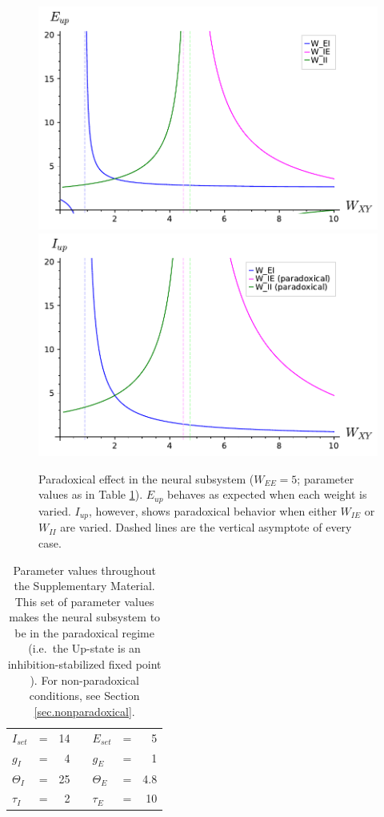 \documentclass[twocolumn]{article}
\newcommand{\EE}{\mathit{EE}}
\newcommand{\IE}{\mathit{IE}}
\newcommand{\II}{\mathit{II}}
\newcommand{\set}{\mathit{set}}
\newcommand{\up}{\mathit{up}}
\begin{document}
\begin{figure}[!ht]
\centering
\includegraphics[width=\linewidth]{paradoxical_E}
\includegraphics[width=\linewidth]{paradoxical_I}
\caption{Paradoxical effect in the neural subsystem ($W_{\EE}=5$; parameter values as in Table \ref{tab.params}). $E_{\up}$ behaves as expected when each weight is varied. $I_{\up}$, however, shows paradoxical behavior when either $W_{\IE}$ or $W_{\II}$ are varied. Dashed lines are the vertical asymptote of every case.}
\label{fig.paradoxical}
\end{figure}



\begin{table}[ht]
\centering
\begin{tabular}{lcrclcr}
$I_{\set}$ & = & 14 & \hspace{1cm} & $E_{\set}$ & = & 5 \\
$g_I$ & = & 4 & & $g_E$ & = & 1 \\
$\Theta_I$ & = & 25 & & $\Theta_E$ & = & 4.8 \\
$\tau_I$ & = & 2 & & $\tau_E$ & = & 10
\end{tabular}
\caption{Parameter values throughout the Supplementary Material. This set of parameter values makes the neural subsystem to be in the paradoxical regime (i.e.\ the Up-state is an inhibition-stabilized fixed point \cite{Sadeh2021}). For non-paradoxical conditions, see Section \ref{sec.nonparadoxical}.}
\label{tab.params}
\end{table}
\end{document}
